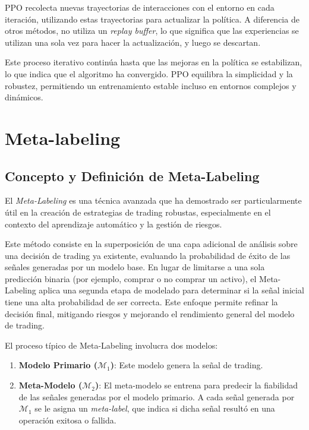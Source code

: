 \documentclass[a4paper,12pt, twoside]{report}
\begin{document}
PPO recolecta nuevas trayectorias de interacciones con el entorno en cada iteración, 
utilizando estas trayectorias para actualizar la política. A diferencia de otros métodos, 
no utiliza un \textit{replay buffer}, lo que significa que las experiencias se utilizan 
una sola vez para hacer la actualización, y luego se descartan.

Este proceso iterativo continúa hasta que las mejoras en la política se estabilizan, 
lo que indica que el algoritmo ha convergido. PPO equilibra la simplicidad y la robustez, 
permitiendo un entrenamiento estable incluso en entornos complejos y dinámicos.


\section{Meta-labeling}

\subsection{Concepto y Definición de Meta-Labeling}


El \textit{Meta-Labeling} es una técnica avanzada que ha demostrado ser particularmente útil
en la creación de estrategias de trading robustas, especialmente en el contexto del aprendizaje
automático y la gestión de riesgos. 

Este método consiste en la superposición de una capa
adicional de análisis sobre una decisión de trading ya existente, evaluando la probabilidad 
de éxito de las señales generadas por un modelo base. En lugar de limitarse
a una sola predicción binaria (por ejemplo, comprar o no comprar un activo), el Meta-
Labeling aplica una segunda etapa de modelado para determinar si la señal inicial tiene
una alta probabilidad de ser correcta. Este enfoque permite refinar la decisión final,
mitigando riesgos y mejorando el rendimiento general del modelo de trading.

El proceso típico de Meta-Labeling involucra dos modelos:
\begin{enumerate}
    \item \textbf{Modelo Primario ($\mathcal{M}_1$)}: Este modelo genera la señal de 
    trading.
    \item \textbf{Meta-Modelo ($\mathcal{M}_2$)}: El meta-modelo se entrena para 
    predecir la fiabilidad de las señales generadas por el modelo primario. A cada 
    señal generada por $\mathcal{M}_1$ se le asigna un \textit{meta-label}, que 
    indica si dicha señal resultó en una operación exitosa o fallida.
\end{enumerate}
\end{document}
